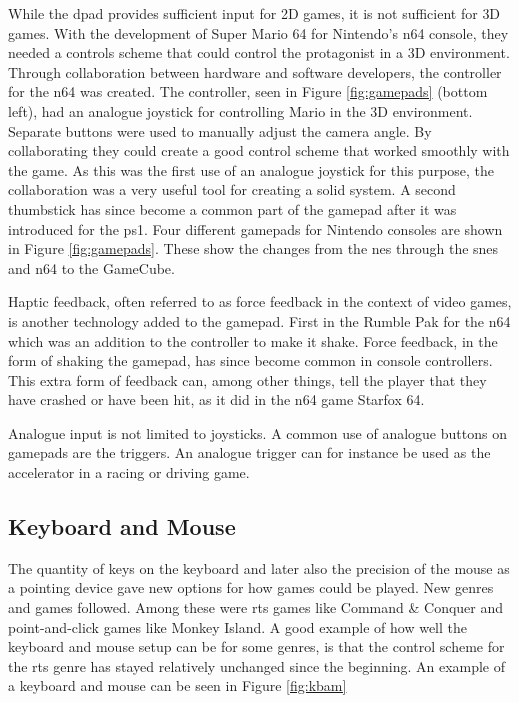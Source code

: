 While the \gls{dpad} provides sufficient input for 2D games, it is not sufficient for 3D games.
With the development of Super Mario 64 for Nintendo's \gls{n64} console, they needed a controls scheme that could control the protagonist in a 3D environment.
Through collaboration between hardware and software developers, the controller for the \gls{n64} was created.
The controller, seen in Figure \ref{fig:gamepads} (bottom left), had an analogue joystick for controlling Mario in the 3D environment. %
Separate buttons were used to manually adjust the camera angle.
By collaborating they could create a good control scheme that worked smoothly with the game.
As this was the first use of an analogue joystick for this purpose, the collaboration was a very useful tool for creating a solid system.
A second thumbstick has since become a common part of the gamepad after it was introduced for the \gls{ps1}.
Four different gamepads for Nintendo consoles are shown in Figure \ref{fig:gamepads}.
These show the changes from the \gls{nes} through the \gls{snes} and \gls{n64} to the GameCube.

Haptic feedback, often referred to as force feedback in the context of video games, is another technology added to the gamepad.
First in the Rumble Pak for the \gls{n64} which was an addition to the controller to make it shake.
Force feedback, in the form of shaking the gamepad, has since become common in console controllers.
This extra form of feedback can, among other things, tell the player that they have crashed or have been hit, as it did in the \gls{n64} game Starfox 64.

Analogue input is not limited to joysticks.
A common use of analogue buttons on gamepads are the triggers.
An analogue trigger can for instance be used as the accelerator in a racing or driving game.


\subsection{Keyboard and Mouse}
The quantity of keys on the keyboard and later also the precision of the mouse as a pointing device gave new options for how games could be played.
New genres and games followed.
Among these were \gls{rts} games like Command \& Conquer and point-and-click games like Monkey Island.
A good example of how well the keyboard and mouse setup can be for some genres, is that the control scheme for the \gls{rts} genre has stayed relatively unchanged since the beginning. An example of a keyboard and mouse can be seen in Figure \ref{fig:kbam}

